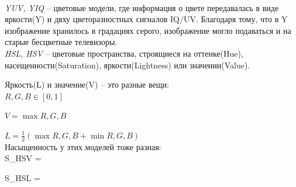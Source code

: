 \begin{figure}[ht!]
\end{figure}\\

\textit{YUV, YIQ} -- цветовые модели, где информация о цвете передавалась в виде яркости(Y) и двху цветоразностных сигналов IQ/UV. Благодаря тому, что в Y изображение хранилось в градациях серого, изображение могло подаваться и на старые бесцветные телевизоры.\\

\textit{HSL, HSV} -- цветовые пространства, строящиеся на оттенке(Hue), насещенности(Saturation), яркости(Lightness) или значении(Value).

Яркость(L) и значение(V) -- это разные вещи:\\

\(R, G, B \in [0, 1]\)

\(V = \max{R, G, B}\)

\(L = \frac{1}{2} (\max{R, G, B} + \min{R, G, B})\)\\

Насыщенность у этих моделей тоже разная:\\

S_{HSV} = 

S_{HSL} = 

\begin{figure}[ht!]
\end{figure}

